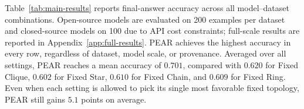 Table~\ref{tab:main-results} reports final-answer accuracy across all model--dataset combinations. Open-source models are evaluated on 200 examples per dataset and closed-source models on 100 due to API cost constraints; full-scale results are reported in Appendix~\ref{app:full-results}. PEAR achieves the highest accuracy in every row, regardless of dataset, model scale, or provenance. Averaged over all settings, PEAR reaches a mean accuracy of $0.701$, compared with $0.620$ for Fixed Clique, $0.602$ for Fixed Star, $0.610$ for Fixed Chain, and $0.609$ for Fixed Ring. Even when each setting is allowed to pick its single most favorable fixed topology, PEAR still gains $5.1$ points on average.




